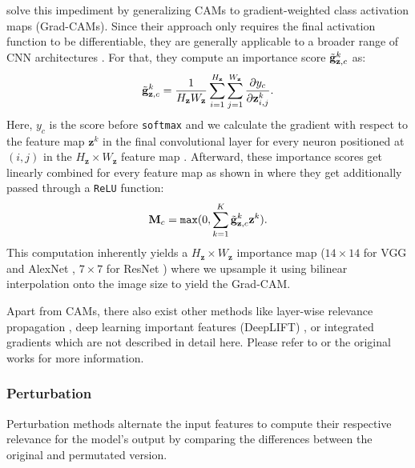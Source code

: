 \citet{SelvarajuCDVPB17} solve this impediment by generalizing CAMs to gradient-weighted class activation maps (Grad-CAMs). Since their approach only requires the final activation function to be differentiable, they are generally applicable to a broader range of CNN architectures \citep{SelvarajuCDVPB17, xie2020explainable}. For that, they compute an importance score $\Tilde{\mathbf{g}}_{\mathbf{z},c}^k$ as:
\begin{equation}
\label{eq:grad_cam_importance}
     \Tilde{\mathbf{g}}_{\mathbf{z},c}^k = \frac{1}{H_\mathbf{z}W_\mathbf{z}} \sum_{i=1}^{H_\mathbf{z}} \sum_{j=1}^{W_\mathbf{z}} \frac{\partial y_c}{\partial \mathbf{z}^k_{i,j}}.
\end{equation}
Here, $y_c$ is the score before \texttt{softmax} and we calculate the gradient with respect to the feature map $\mathbf{z}^k$ in the final convolutional layer for every neuron positioned at $(i,j)$ in the $H_\mathbf{z} \times W_\mathbf{z}$ feature map \citep{SelvarajuCDVPB17, xie2020explainable}. Afterward, these importance scores get linearly combined for every feature map as shown in  where they get additionally passed through a \texttt{ReLU} function:
\begin{equation}
\label{eq:grad_cam_map}
    \mathbf{M}_c = \mathtt{max}(0,\sum_{k=1}^K\Tilde{\mathbf{g}}_{\mathbf{z},c}^k \mathbf{z}^k).
\end{equation}
This computation inherently yields a $H_\mathbf{z} \times W_\mathbf{z}$ importance map ($14 \times 14$ for VGG \citep{SimonyanZ14a} and AlexNet \citep{KrizhevskySH12}, $7 \times 7$ for ResNet \citep{HeZRS16}) where we upsample it using bilinear interpolation onto the image size to yield the Grad-CAM.

Apart from CAMs, there also exist other methods like layer-wise relevance propagation \citep{MontavonLBSM17, DingLLS17, LapuschkinBMMS16, Bach2015}, deep learning important features (DeepLIFT) \citep{ShrikumarGK17}, or integrated gradients \citep{SundararajanTY17} which are not described in detail here. Please refer to \citet{xie2020explainable} or the original works for more information.

\subsubsection{Perturbation}
Perturbation methods alternate the input features to compute their respective relevance for the model's output by comparing the differences between the original and permutated version.


